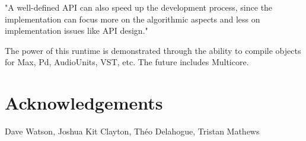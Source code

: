 \documentclass[twoside,10pt]{article}
\begin{document}
"A well-defined API can also speed up the development process, since the implementation can focus more on the algorithmic aspects and less on implementation issues like API design." \cite{Lerch:2005}

The power of this runtime is demonstrated through the ability to compile objects for Max, Pd, AudioUnits, VST, etc.  The future includes Multicore.



\section{Acknowledgements} %

Dave Watson, Joshua Kit Clayton, Th\'eo Delahogue, Tristan Mathews




\end{document}
